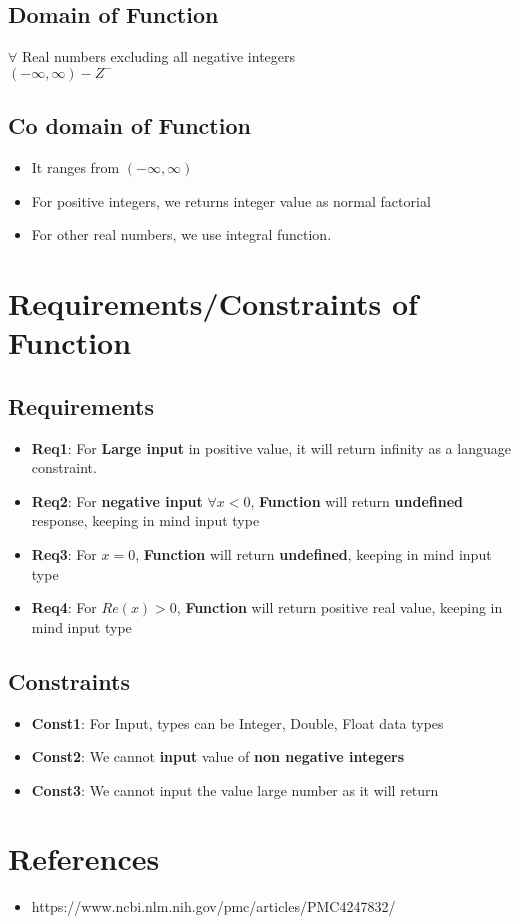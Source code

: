 \documentclass{article}
\begin{document}
\subsection{Domain of Function}
$\forall$ Real numbers excluding all negative integers \\
$(-\infty, \infty) - Z^{-}$

\subsection{Co domain of Function}
\begin{itemize}
\item It ranges from $(-\infty, \infty)$
\item For positive integers, we returns integer value as normal factorial
\item For other real numbers, we use integral function.
\end{itemize}

\section{Requirements/Constraints of Function}
\subsection{Requirements}
\begin{itemize}
\item \textbf{Req1}: For \textbf{Large input} in positive value, it will return infinity as a language constraint.
\item \textbf{Req2}: For \textbf{negative input} $\forall x<0 $, \textbf{Function} will return \textbf{undefined} response, keeping in mind input type
\item \textbf{Req3}: For \textbf{$x=0$}, \textbf{Function} will return \textbf{undefined}, keeping in mind input type
\item \textbf{Req4}: For \textbf{$Re(x) > 0$}, \textbf{Function} will return positive real value, keeping in mind input type
\end{itemize}

\subsection{Constraints}
\begin{itemize}
\item \textbf{Const1}: For Input, types can be Integer, Double, Float data types
\item \textbf{Const2}: We cannot \textbf{input} value of \textbf{non negative integers}
\item \textbf{Const3}: We cannot input the value large number as it will return 
\end{itemize}

\section{References}
\begin{itemize}
\item https://www.ncbi.nlm.nih.gov/pmc/articles/PMC4247832/
\end{itemize}
\end{document}

